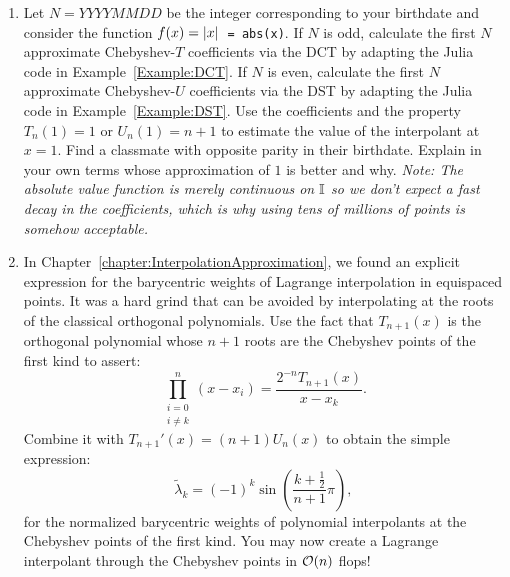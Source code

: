 \begin{enumerate}
\item Let $N = YYYYMMDD$ be the integer corresponding to your birthdate and consider the function $f(x) = \left|{x}\right|$\verb+ = abs(x)+. If $N$ is odd, calculate the first $N$ approximate Chebyshev-$T$ coefficients via the DCT by adapting the {\sc Julia} code in Example~\ref{Example:DCT}. If $N$ is even, calculate the first $N$ approximate Chebyshev-$U$ coefficients via the DST by adapting the {\sc Julia} code in Example~\ref{Example:DST}. Use the coefficients and the property $T_n(1) = 1$ or $U_n(1) = n+1$ to estimate the value of the interpolant at $x=1$. Find a classmate with opposite parity in their birthdate. Explain in your own terms whose approximation of $1$ is better and why. {\em Note: The absolute value function is merely continuous on $\mathbb{I}$ so we don't expect a fast decay in the coefficients, which is why using tens of millions of points is somehow acceptable.}

\item In Chapter~\ref{chapter:InterpolationApproximation}, we found an explicit expression for the barycentric weights of Lagrange interpolation in equispaced points. It was a hard grind that can be avoided by interpolating at the roots of the classical orthogonal polynomials. Use the fact that $T_{n+1}(x)$ is the orthogonal polynomial whose $n+1$ roots are the Chebyshev points of the first kind to assert:
\[
\prod_{\substack{i=0\\i\ne k}}^n(x-x_i) = \dfrac{2^{-n}T_{n+1}(x)}{x-x_k}.
\]
Combine it with $T_{n+1}'(x) = (n+1)U_n(x)$ to obtain the simple expression:
\[
\tilde{\lambda}_k = (-1)^k\sin\left(\dfrac{k+\tfrac{1}{2}}{n+1}\pi\right),
\]
for the normalized barycentric weights of polynomial interpolants at the Chebyshev points of the first kind. You may now create a Lagrange interpolant through the Chebyshev points in $\mathcal{O}(n)$ flops!

\end{enumerate}